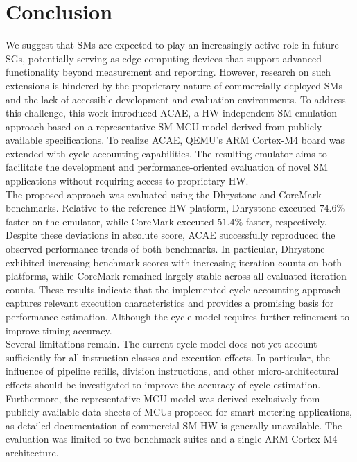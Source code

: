 \documentclass[english]{tudscrartcl}
\begin{document}
	\section{Conclusion}
		We suggest that \acp{SM} are expected to play an increasingly active role in future \acp{SG}, potentially serving as edge-computing devices that support advanced functionality beyond measurement and reporting.
		However, research on such extensions is hindered by the proprietary nature of commercially deployed \acp{SM} and the lack of accessible development and evaluation environments.
		To address this challenge, this work introduced \ac{ACAE}, a \ac{HW}-independent \ac{SM} emulation approach based on a representative \ac{SM} \ac{MCU} model derived from publicly available specifications.
		To realize \ac{ACAE}, QEMU's ARM Cortex-M4 board was extended with cycle-accounting capabilities.
		The resulting emulator aims to facilitate the development and performance-oriented evaluation of novel \ac{SM} applications without requiring access to proprietary \ac{HW}.
		\\
		The proposed approach was evaluated using the Dhrystone and CoreMark benchmarks.
		Relative to the reference \ac{HW} platform, Dhrystone executed $74.6\%$ faster on the emulator, while CoreMark executed $51.4\%$ faster, respectively.
		Despite these deviations in absolute score, ACAE successfully reproduced the observed performance trends of both benchmarks.
		In particular, Dhrystone exhibited increasing benchmark scores with increasing iteration counts on both platforms, while CoreMark remained largely stable across all evaluated iteration counts.
		These results indicate that the implemented cycle-accounting approach captures relevant execution characteristics and provides a promising basis for performance estimation.
		Although the cycle model requires further refinement to improve timing accuracy.
		\\
		Several limitations remain. The current cycle model does not yet account sufficiently for all instruction classes and execution effects.
		In particular, the influence of pipeline refills, division instructions, and other micro-architectural effects should be investigated to improve the accuracy of cycle estimation.
		Furthermore, the representative \ac{MCU} model was derived exclusively from publicly available data sheets of \acp{MCU} proposed for smart metering applications, as detailed documentation of commercial \ac{SM} \ac{HW} is generally unavailable.
		The evaluation was limited to two benchmark suites and a single ARM Cortex-M4 architecture.
\end{document}
